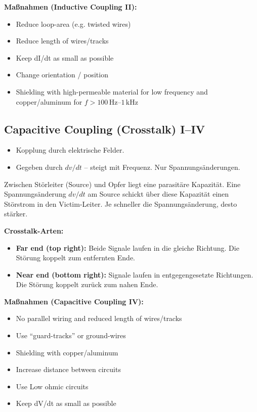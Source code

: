 \documentclass[11pt,a4paper]{article}
\begin{document}
\textbf{Maßnahmen (Inductive Coupling II):}
\begin{itemize}
    \item Reduce loop-area (e.g. twisted wires)
    \item Reduce length of wires/tracks
    \item Keep dI/dt as small as possible
    \item Change orientation / position
    \item Shielding with high-permeable material for low frequency and copper/aluminum for $f > 100\,\text{Hz}$--$1\,\text{kHz}$
\end{itemize}

\subsection{Capacitive Coupling (Crosstalk) I--IV}
\begin{itemize}
    \item Kopplung durch elektrische Felder.
    \item Gegeben durch $dv/dt$ -- steigt mit Frequenz. Nur Spannungsänderungen.
\end{itemize}

Zwischen Störleiter (Source) und Opfer liegt eine parasitäre Kapazität. Eine Spannungsänderung $dv/dt$ am Source schickt über diese Kapazität einen Störstrom in den Victim-Leiter. Je schneller die Spannungsänderung, desto stärker.

\textbf{Crosstalk-Arten:}
\begin{itemize}
    \item \textbf{Far end (top right):} Beide Signale laufen in die gleiche Richtung. Die Störung koppelt zum entfernten Ende.
    \item \textbf{Near end (bottom right):} Signale laufen in entgegengesetzte Richtungen. Die Störung koppelt zurück zum nahen Ende.
\end{itemize}

\textbf{Maßnahmen (Capacitive Coupling IV):}
\begin{itemize}
    \item No parallel wiring and reduced length of wires/tracks
    \item Use ``guard-tracks'' or ground-wires
    \item Shielding with copper/aluminum
    \item Increase distance between circuits
    \item Use Low ohmic circuits
    \item Keep dV/dt as small as possible
\end{itemize}
\end{document}
